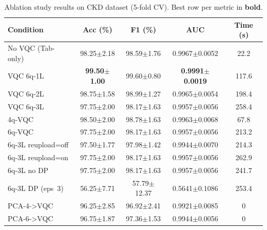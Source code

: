 \begin{table}[!ht]
\centering
\caption{Ablation study results on CKD dataset (5-fold CV). Best row per metric in \textbf{bold}.}
\label{tab:ablation}
\begin{tabular}{lcccc}
\toprule
Condition & Acc (\%) & F1 (\%) & AUC & Time (s) \\
\midrule
  No VQC (Tab-only) & 98.25$\pm$2.18 & 98.59$\pm$1.76 & 0.9967$\pm$0.0052 & 22.2 \\
  VQC 6q-1L & \textbf{99.50$\pm$1.00} & 99.60$\pm$0.80 & \textbf{0.9991$\pm$0.0019} & 117.6 \\
  VQC 6q-2L & 98.75$\pm$1.58 & 98.99$\pm$1.27 & 0.9965$\pm$0.0054 & 198.4 \\
  VQC 6q-3L & 97.75$\pm$2.00 & 98.17$\pm$1.63 & 0.9957$\pm$0.0056 & 258.4 \\
  4q-VQC & 98.50$\pm$2.00 & 98.78$\pm$1.63 & 0.9963$\pm$0.0068 & 67.8 \\
  6q-VQC & 97.75$\pm$2.00 & 98.17$\pm$1.63 & 0.9957$\pm$0.0056 & 213.2 \\
  6q-3L reupload=off & 97.50$\pm$1.77 & 97.98$\pm$1.42 & 0.9944$\pm$0.0070 & 214.3 \\
  6q-3L reupload=on & 97.75$\pm$2.00 & 98.17$\pm$1.63 & 0.9957$\pm$0.0056 & 262.9 \\
  6q-3L no DP & 97.75$\pm$2.00 & 98.17$\pm$1.63 & 0.9957$\pm$0.0056 & 241.7 \\
  6q-3L DP (eps~3) & 56.25$\pm$7.71 & 57.79$\pm$12.37 & 0.5641$\pm$0.1086 & 253.4 \\
  PCA-4->VQC & 96.25$\pm$2.85 & 96.92$\pm$2.41 & 0.9921$\pm$0.0085 & 0 \\
  PCA-6->VQC & 96.75$\pm$1.87 & 97.36$\pm$1.53 & 0.9944$\pm$0.0056 & 0 \\
\bottomrule
\end{tabular}
\end{table}
